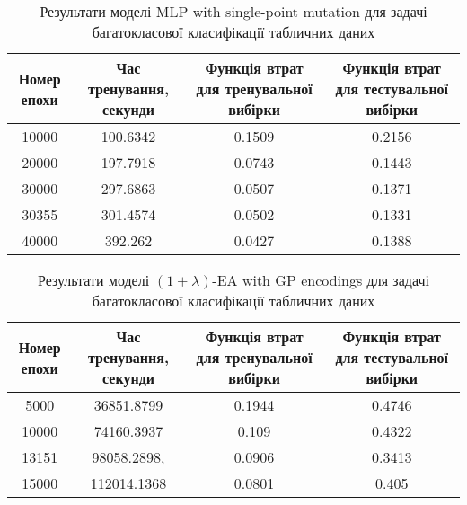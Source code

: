 \begin{table}[ht]
	\centering
	\begin{adjustbox}{max width=\textwidth}
		\begin{tabular}{|c|c|c|c|}
			\hline 
			Номер епохи & Час тренування, секунди & Функція втрат для тренувальної вибірки & Функція втрат для тестувальної вибірки \\
			\hline 
			10000 & 100.6342 & 0.1509 & 0.2156 \\
			\hline 
			20000 & 197.7918 & 0.0743 & 0.1443 \\
			\hline
			30000 & 297.6863 & 0.0507 & 0.1371 \\
			\hline
			30355 & 301.4574 & 0.0502 & 0.1331 \\
			\hline
			40000 & 392.262 & 0.0427 & 0.1388 \\
			\hline
		\end{tabular}
	\end{adjustbox}
	\caption{Результати моделі MLP with single-point mutation для задачі багатокласової класифікації табличних даних}
	\label{mlp_spm_mc_td_results}
\end{table}

\begin{table}[ht]
	\centering
	\begin{adjustbox}{max width=\textwidth}
		\begin{tabular}{|c|c|c|c|}
			\hline 
			Номер епохи & Час тренування, секунди & Функція втрат для тренувальної вибірки & Функція втрат для тестувальної вибірки \\
			\hline 
			5000 & 36851.8799 & 0.1944 & 0.4746 \\
			\hline 
			10000 & 74160.3937 & 0.109 & 0.4322 \\
			\hline
			13151 & 98058.2898, & 0.0906 & 0.3413 \\
			\hline
			15000 & 112014.1368 & 0.0801 & 0.405 \\
			\hline
		\end{tabular}
	\end{adjustbox}
	\caption{Результати моделі $(1+\lambda)$-EA with GP encodings для задачі багатокласової класифікації табличних даних}
	\label{ea_mc_td_results}
\end{table}

